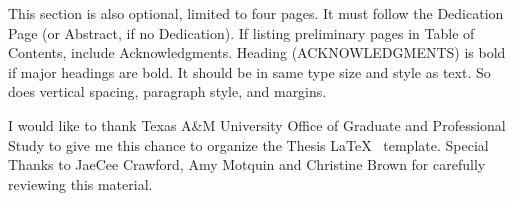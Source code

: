 \TAMUAcknowledgmentFormat

This section is also optional, limited to four pages. It must follow the Dedication Page (or Abstract, if no Dedication). If listing preliminary pages in Table of Contents, include Acknowledgments. Heading (\MakeUppercase{Acknowledgments}) is bold if major headings are bold. It should be in same type size and style as text. So does vertical spacing, paragraph style, and margins.

I would like to thank Texas A\&M University Office of Graduate and Professional Study to give me this chance to organize the Thesis \LaTeX ~ template. Special Thanks to JaeCee Crawford, Amy Motquin and Christine Brown for carefully reviewing this material.  %
